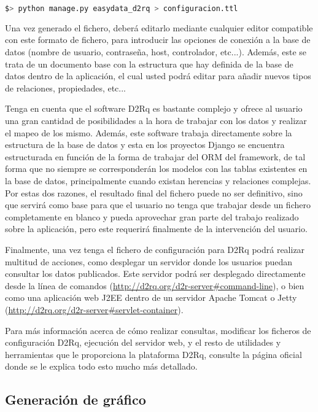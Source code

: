 \begin{lstlisting}[frame=L, language=bash, basicstyle=\footnotesize]
$> python manage.py easydata_d2rq > configuracion.ttl
\end{lstlisting}

Una vez generado el fichero, deberá editarlo mediante cualquier editor
compatible con este formato de fichero, para introducir las opciones de conexión
a la base de datos (nombre de usuario, contraseña, host, controlador, etc...).
Además, este se trata de un documento base con la estructura que hay definida de
la base de datos dentro de la aplicación, el cual usted podrá editar para añadir
nuevos tipos de relaciones, propiedades, etc...

Tenga en cuenta que el software D2Rq es bastante complejo y ofrece al usuario
una gran cantidad de posibilidades a la hora de trabajar con los datos y
realizar el mapeo de los mismo. Además, este software trabaja directamente sobre
la estructura de la base de datos y esta en los proyectos Django se encuentra
estructurada en función de la forma de trabajar del ORM del framework, de tal
forma que no siempre se corresponderán los modelos con las tablas existentes en
la base de datos, principalmente cuando existan herencias y relaciones
complejas. Por estas dos razones, el resultado final del fichero puede no ser
definitivo, sino que servirá como base para que el usuario no tenga que trabajar
desde un fichero completamente en blanco y pueda aprovechar gran parte del
trabajo realizado sobre la aplicación, pero este requerirá finalmente de la
intervención del usuario.

Finalmente, una vez tenga el fichero de configuración para D2Rq podrá realizar
multitud de acciones, como desplegar un servidor donde los usuarios puedan
consultar los datos publicados. Este servidor podrá ser desplegado directamente
desde la línea de comandos (\url{http://d2rq.org/d2r-server#command-line}), o
bien como una aplicación web J2EE dentro de un servidor Apache Tomcat o Jetty
(\url{http://d2rq.org/d2r-server#servlet-container}).

Para más información acerca de cómo realizar consultas, modificar los ficheros
de configuración D2Rq, ejecución del servidor web, y el resto de utilidades y
herramientas que le proporciona la plataforma D2Rq, consulte la página oficial
\cite{d2rq} donde se le explica todo esto mucho más detallado.

\subsection{Generación de gráfico}

